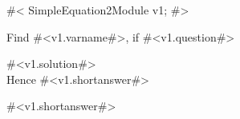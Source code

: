 

#<
SimpleEquation2Module v1;
#>

Find #<v1.varname#>, if #<v1.question#>

#<v1.solution#>  \\[1.6mm]
Hence #<v1.shortanswer#> 

#<v1.shortanswer#>


